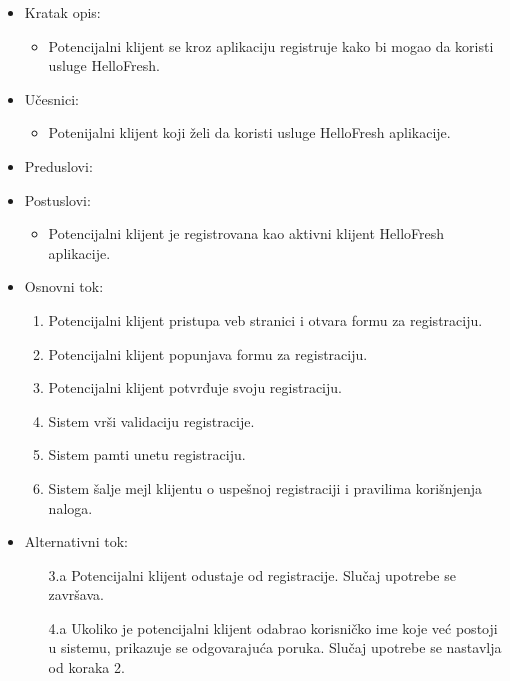 
\begin{itemize}
    \item Kratak opis:
        \begin{itemize}
            \item Potencijalni klijent se kroz aplikaciju registruje kako bi mogao da koristi usluge HelloFresh.
        \end{itemize}
    \item Učesnici:
        \begin{itemize}
            \item Potenijalni klijent koji želi da koristi usluge HelloFresh aplikacije.
        \end{itemize}
    \item Preduslovi:
    \item Postuslovi:
        \begin{itemize}
            \item Potencijalni klijent je registrovana kao aktivni klijent HelloFresh aplikacije.
        \end{itemize}
    \item Osnovni tok:
        \begin{enumerate}
            \item Potencijalni klijent pristupa veb stranici i otvara formu za registraciju.
            \item Potencijalni klijent popunjava formu za registraciju.
            \item Potencijalni klijent potvrđuje svoju registraciju.
            \item Sistem vrši validaciju registracije.
            \item Sistem pamti unetu registraciju.
            \item Sistem šalje mejl klijentu o uspešnoj registraciji i pravilima korišnjenja naloga.
        \end{enumerate}
    \item Alternativni tok:
        \begin{itemize}
            \item[3.a] Potencijalni klijent odustaje od registracije. Slučaj upotrebe se završava.
            \item[4.a] Ukoliko je potencijalni klijent odabrao korisničko ime koje već postoji u sistemu, prikazuje se odgovarajuća poruka. Slučaj upotrebe se nastavlja od koraka 2.

\end{itemize}
\end{itemize}
